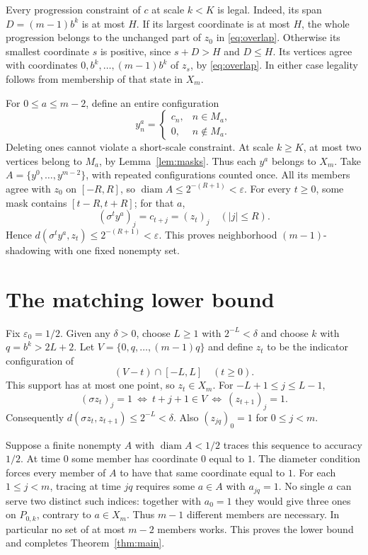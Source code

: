 \documentclass[11pt]{article}
\newcommand{\diam}{\operatorname{diam}}
\begin{document}
Every progression constraint of $c$ at scale $k<K$ is legal.
Indeed, its span $D=(m-1)b^k$ is at most $H$. If its largest
coordinate is at most $H$, the whole progression belongs to the
unchanged part of $z_0$ in \eqref{eq:overlap}. Otherwise its smallest
coordinate $s$ is positive, since $s+D>H$ and $D\leq H$.
Its vertices agree with coordinates $0,b^k,\ldots,(m-1)b^k$ of
$z_s$, by \eqref{eq:overlap}. In either case legality follows from
membership of that state in $X_m$.

For $0\leq a\leq m-2$, define an entire configuration
\[
 y^a_n=\begin{cases}c_n,&n\in M_a,\\0,&n\notin M_a.\end{cases}
\]
Deleting ones cannot violate a short-scale constraint. At scale $k\geq K$,
at most two vertices belong to $M_a$, by Lemma~\ref{lem:masks}.
Thus each $y^a$ belongs to $X_m$. Take
$A=\{y^0,\ldots,y^{m-2}\}$, with repeated configurations counted once.
All its members agree with $z_0$ on $[-R,R]$, so
$\diam A\leq2^{-(R+1)}<\varepsilon$. For every $t\geq0$,
some mask contains $[t-R,t+R]$; for that $a$,
\[
 (\sigma^t y^a)_j=c_{t+j}=(z_t)_j\quad(|j|\leq R).
\]
Hence $d(\sigma^t y^a,z_t)\leq2^{-(R+1)}<\varepsilon$.
This proves neighborhood $(m-1)$-shadowing with one fixed nonempty set.

\section{The matching lower bound}
Fix $\varepsilon_0=1/2$. Given any $\delta>0$, choose $L\geq1$
with $2^{-L}<\delta$ and choose $k$ with $q=b^k>2L+2$.
Let $V=\{0,q,\ldots,(m-1)q\}$ and define $z_t$ to be the
indicator configuration of
\[
 (V-t)\cap[-L,L]\quad(t\geq0).
\]
This support has at most one point, so $z_t\in X_m$.
For $-L+1\leq j\leq L-1$,
\[
 (\sigma z_t)_j=1\ \Longleftrightarrow\ t+j+1\in V
 \ \Longleftrightarrow\ (z_{t+1})_j=1.
\]
Consequently $d(\sigma z_t,z_{t+1})\leq2^{-L}<\delta$.
Also $(z_{jq})_0=1$ for $0\leq j<m$.

Suppose a finite nonempty $A$ with $\diam A<1/2$ traces this sequence
to accuracy $1/2$. At time $0$ some member has coordinate $0$ equal
to $1$. The diameter condition forces every member of $A$ to have
that same coordinate equal to $1$. For each $1\leq j<m$, tracing
at time $jq$ requires some $a\in A$ with $a_{jq}=1$.
No single $a$ can serve two distinct such indices: together with
$a_0=1$ they would give three ones on $P_{0,k}$, contrary to
$a\in X_m$. Thus $m-1$ different members are necessary. In particular
no set of at most $m-2$ members works. This proves the lower bound
and completes Theorem~\ref{thm:main}.
\end{document}
